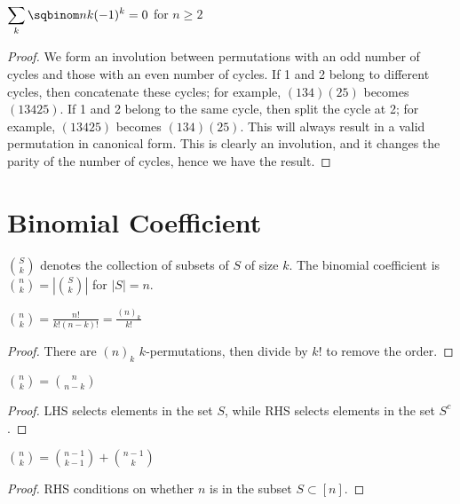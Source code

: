 \documentclass[a4paper]{article}
\begin{document}
\begin{proposition}
$\displaystyle\sum_{k}\sqbinom nk(-1)^k=0$ for $n\geq2$

\begin{hl}
\begin{proof}
We form an involution between permutations with an odd number of cycles and those with an even number of cycles. If 1 and 2 belong to different cycles, then concatenate these cycles; for example, $(134)(25)$ becomes $(13425)$. If 1 and 2 belong to the same cycle, then split the cycle at 2; for example, $(13425)$ becomes $(134)(25)$. This will always result in a valid permutation in canonical form. This is clearly an involution, and it changes the parity of the number of cycles, hence we have the result.
\end{proof}
\end{hl}
\end{proposition}

\section{Binomial Coefficient}

\begin{definition}
$\binom Sk$ denotes the collection of subsets of $S$ of size $k$. The binomial coefficient is $\binom nk=\left|\binom Sk\right|$ for $|S|=n$.
\end{definition}

\begin{theorem}
$\displaystyle \binom nk=\frac{n!}{k!(n-k)!}=\frac{(n)_k}{k!}$

\begin{hl}
\begin{proof}
There are $(n)_k$ $k$-permutations, then divide by $k!$ to remove the order.
\end{proof}
\end{hl}
\end{theorem}

\begin{theorem}
$\displaystyle \binom nk=\binom n{n-k}$

\begin{hl}
\begin{proof}
LHS selects elements in the set $S$, while RHS selects elements in the set $S^c$.
\end{proof}
\end{hl}
\end{theorem}

\begin{theorem}
$\displaystyle \binom nk=\binom{n-1}{k-1}+\binom{n-1}k$

\begin{hl}
\begin{proof}
RHS conditions on whether $n$ is in the subset $S\subset [n]$.
\end{proof}
\end{hl}
\end{theorem}
\end{document}
